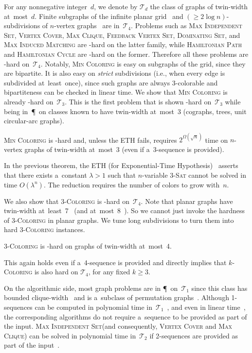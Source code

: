 \documentclass[a4paper,USenglish,cleveref,hyperref,autoref]{lipics-v2021}
\newcommand{\mis}{\textsc{Max Independent Set}\xspace}
\newcommand{\vc}{\textsc{Vertex Cover}\xspace}
\newcommand{\cli}{\textsc{Max Clique}\xspace}
\newcommand{\fvs}{\textsc{Feedback Vertex Set}\xspace}
\newcommand{\tcol}{\textsc{3-Coloring}\xspace}
\newcommand{\kcol}{\textsc{$k$-Coloring}\xspace}
\newcommand{\hamp}{\textsc{Hamiltonian Path}\xspace}
\newcommand{\hamc}{\textsc{Hamiltonian Cycle}\xspace}
\newcommand{\mds}{\textsc{Dominating Set}\xspace}
\newcommand{\mim}{\textsc{Max Induced Matching}\xspace}
\newcommand{\chr}{\textsc{Min Coloring}\xspace}
\begin{document}
For any nonnegative integer~$d$, we denote by $\mathcal T_d$ the class of graphs of twin-width at~most~$d$.
Finite subgraphs of the infinite planar grid~\cite{twin-width1} and $(\geqslant 2 \log n)$-subdivisions of $n$-vertex graphs~\cite{BergeBonnetDepres} are in~$\mathcal T_4$.
Problems such as \mis, \vc, \cli, \fvs, \mds, and \mim are \NP-hard on the latter family, while \hamp and \hamc are \NP-hard on the former.
Therefore all these problems are \NP-hard on~$\mathcal T_4$.
Notably, \chr is easy on subgraphs of the grid, since they are bipartite.
It is also easy on \emph{strict} subdivisions (i.e., when every edge is subdivided at~least~once), since such graphs are always 3-colorable and bipartiteness can be checked in linear time.
We show that \chr is already \NP-hard on~$\mathcal T_3$.
This is the first problem that is shown \NP-hard on~$\mathcal T_3$ while being in~\P\ on classes known to have twin-width at~most~3 (cographs, trees, unit circular-arc graphs).

\begin{theorem}\label{thm:col-tww-3}
  \chr is \NP-hard and, unless the ETH fails, requires $2^{\Omega(\sqrt{n})}$ time on $n$-vertex graphs of twin-width at~most~3 (even if a~3-sequence is provided). 
\end{theorem}

In the previous theorem, the ETH (for Exponential-Time Hypothesis)~\cite{Impagliazzo01} asserts that there exists a~constant $\lambda>1$ such that $n$-variable \textsc{3-Sat} cannot be solved in time $O(\lambda^n)$.
The reduction requires the number of colors to grow with~$n$.

We also show that \tcol is \NP-hard on~$\mathcal T_4$.
Note that planar graphs have twin-width at~least~7~\cite{Kral25} (and at~most~8~\cite{Hlineny25}).
So we cannot just invoke the hardness of \tcol in planar graphs.
We tune long subdivisions to turn them into hard \tcol instances.

\begin{theorem}\label{thm:tcol-hardness}
  \tcol is \NP-hard on graphs of twin-width at~most~4.  
\end{theorem}

This again holds even if a~\mbox{4-sequence} is provided and directly implies that \kcol is also hard on $\mathcal T_4$, for any fixed $k \geqslant 3$.

On the algorithmic side, most graph problems are in \P\ on~$\mathcal T_1$ since this class has bounded clique-width~\cite{twin-width6} and is a~subclass of permutation graphs~\cite{AhnTwinWidthOne}.
Although 1-sequences can be computed in polynomial time in~$\mathcal T_1$~\cite{tww-polyker}, and even in linear time~\cite{AhnTwinWidthOne}, the corresponding algorithms do not require a~sequence to be provided as part of the input. 
\mis (and consequently, \vc and \cli) can be solved in polynomial time in~$\mathcal T_2$ if 2-sequences are provided as part of the input~\cite{twin-width3}.
\end{document}
